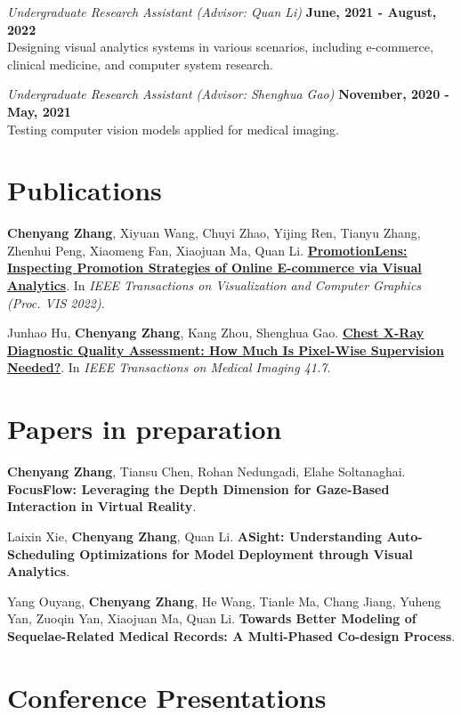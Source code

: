 \documentclass[margin,line]{res}
\begin{document}
\begin{resume}
\vspace{-.2cm}
{\em Undergraduate Research Assistant (Advisor: Quan Li)} \hfill {\bf June, 2021 - August, 2022}\\
Designing visual analytics systems in various scenarios, including e-commerce, clinical medicine, and computer system research.

{\em Undergraduate Research Assistant (Advisor: Shenghua Gao)} \hfill {\bf November, 2020 - May, 2021}\\
Testing computer vision models applied for medical imaging.


\section{Publications}

\textbf{Chenyang Zhang}, Xiyuan Wang, Chuyi Zhao, Yijing Ren, Tianyu Zhang, Zhenhui Peng, Xiaomeng Fan, Xiaojuan Ma, Quan Li. \href{https://ieeexplore.ieee.org/document/9903289}{\textbf{PromotionLens: Inspecting Promotion Strategies of Online E-commerce via Visual Analytics}}. In \textit{IEEE Transactions on Visualization and Computer Graphics (Proc. VIS 2022)}.

Junhao Hu, \textbf{Chenyang Zhang}, Kang Zhou, Shenghua Gao. \href{https://ieeexplore.ieee.org/document/9703342}{\textbf{Chest X-Ray Diagnostic Quality Assessment: How Much Is Pixel-Wise Supervision Needed?}}. In \textit{IEEE Transactions on Medical Imaging 41.7}.


\section{Papers in preparation}

\textbf{Chenyang Zhang}, Tiansu Chen, Rohan Nedungadi, Elahe Soltanaghai. \textbf{FocusFlow: Leveraging the Depth Dimension for Gaze-Based Interaction in Virtual Reality}.

Laixin Xie, \textbf{Chenyang Zhang}, Quan Li. \textbf{ASight: Understanding Auto-Scheduling Optimizations for Model Deployment through Visual Analytics}.

Yang Ouyang, \textbf{Chenyang Zhang}, He Wang, Tianle Ma, Chang Jiang, Yuheng Yan, Zuoqin Yan, Xiaojuan Ma, Quan Li. \textbf{Towards Better Modeling of Sequelae-Related Medical Records: A Multi-Phased Co-design Process}.


\section{Conference Presentations}


\end{resume}
\end{document}
